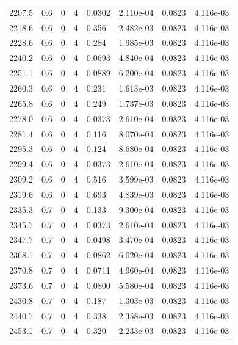 \documentclass[preview]{standalone}
\begin{document}
{{{{{{{{{{\begin{tabular}{L{1.2cm}C{1.2cm} C{0.3cm}C{0.5cm} C{1.4cm}C{1.4cm} C{1.4cm}C{1.4cm}}
  2207.5  &   0.6  & 0     &  4 &  0.0302  & 2.110e-04  & 0.0823 &  4.116e-03   \\ 
  2218.6  &   0.6  & 0     &  4 &  0.356  & 2.482e-03  & 0.0823 &  4.116e-03   \\ 
  2228.6  &   0.6  & 0     &  4 &  0.284  & 1.985e-03  & 0.0823 &  4.116e-03   \\ 
  2240.2  &   0.6  & 0     &  4 &  0.0693  & 4.840e-04  & 0.0823 &  4.116e-03   \\ 
  2251.1  &   0.6  & 0     &  4 &  0.0889  & 6.200e-04  & 0.0823 &  4.116e-03   \\ 
  2260.3  &   0.6  & 0     &  4 &  0.231  & 1.613e-03  & 0.0823 &  4.116e-03   \\ 
  2265.8  &   0.6  & 0     &  4 &  0.249  & 1.737e-03  & 0.0823 &  4.116e-03   \\ 
  2278.0  &   0.6  & 0     &  4 &  0.0373  & 2.610e-04  & 0.0823 &  4.116e-03   \\ 
  2281.4  &   0.6  & 0     &  4 &  0.116  & 8.070e-04  & 0.0823 &  4.116e-03   \\ 
  2295.3  &   0.6  & 0     &  4 &  0.124  & 8.680e-04  & 0.0823 &  4.116e-03   \\ 
  2299.4  &   0.6  & 0     &  4 &  0.0373  & 2.610e-04  & 0.0823 &  4.116e-03   \\ 
  2309.2  &   0.6  & 0     &  4 &  0.516  & 3.599e-03  & 0.0823 &  4.116e-03   \\ 
  2319.6  &   0.6  & 0     &  4 &  0.693  & 4.839e-03  & 0.0823 &  4.116e-03   \\ 
  2335.3  &   0.7  & 0     &  4 &  0.133  & 9.300e-04  & 0.0823 &  4.116e-03   \\ 
  2345.7  &   0.7  & 0     &  4 &  0.0373  & 2.610e-04  & 0.0823 &  4.116e-03   \\ 
  2347.7  &   0.7  & 0     &  4 &  0.0498  & 3.470e-04  & 0.0823 &  4.116e-03   \\ 
  2368.1  &   0.7  & 0     &  4 &  0.0862  & 6.020e-04  & 0.0823 &  4.116e-03   \\ 
  2370.8  &   0.7  & 0     &  4 &  0.0711  & 4.960e-04  & 0.0823 &  4.116e-03   \\ 
  2373.6  &   0.7  & 0     &  4 &  0.0800  & 5.580e-04  & 0.0823 &  4.116e-03   \\ 
  2430.8  &   0.7  & 0     &  4 &  0.187  & 1.303e-03  & 0.0823 &  4.116e-03   \\ 
  2440.7  &   0.7  & 0     &  4 &  0.338  & 2.358e-03  & 0.0823 &  4.116e-03   \\ 
  2453.1  &   0.7  & 0     &  4 &  0.320  & 2.233e-03  & 0.0823 &  4.116e-03   \\ 

\end{tabular}}}}}}}}}}}
\end{document}
